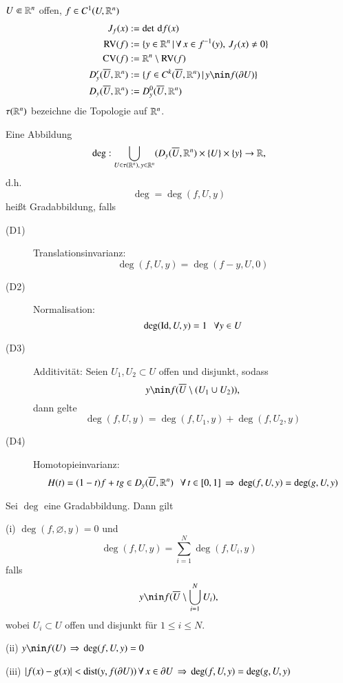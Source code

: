 $U\Subset \mathbb{R}^n$ offen, $f\in C^1(U,\mathbb{R}^n)$
\begin{align*}
    J_f(x)&:=\det \d f(x)\\
    \RV(f)&:=\{ y\in \R^n \,| \, \forall \, x\in f^{-1}(y), \, J_f(x)\neq 0 \}\\
    \CV(f)&:= \R^n \setminus \RV(f)\\
    D_y^r(\ol U, \R^n)&:=\{f\in C^k(\ol U, \R^n)\,|\,y\nin f(\partial U)\}\\
    D_y(\ol U, \R^n)&:=D_y^0(\ol U, \R^n)
\end{align*}
$\tau(\mathbb{R}^n)$ bezeichne die Topologie auf $\mathbb{R}^n$.
\begin{defi}
    Eine Abbildung
    \[
        \deg: \bigcup_{U\in \tau(\mathbb{R}^n),\, y\in \mathbb{R}^n} (D_y(\overline U, \mathbb{R}^n)\times \{U\}\times \{y\}\rightarrow \mathbb{R},
    \]
    d.h.
    \[
        \deg=\deg(f,U,y) 
    \]
    heißt Gradabbildung, falls
    \begin{description}
        \item[(D1)]
        Translationsinvarianz: 
        \[
            \deg(f,U,y)=\deg(f-y,U,0)
        \]
        \item[(D2)]
        Normalisation:
        \[
            \deg(\mathrm{Id},U,y)=1 \hspace{.25cm} \forall y\in U
        \]
        \item[(D3)]
        Additivität: Seien $U_1,U_2\subset U$ offen und disjunkt, sodass
        \[
            y\nin f(\ol U\setminus(U_1\cup U_2)),
        \]
        dann gelte
        \[
            \deg(f,U,y)=\deg(f,U_1,y)+\deg(f,U_2,y)
        \]
        \item[(D4)]
        Homotopieinvarianz: 
        \[
            H(t)=(1-t)f+tg \in D_y(\overline U,\mathbb{R}^n) \hspace{.25cm} \forall \, t\in [0,1]\, \Rightarrow \, \deg(f,U,y)=\deg(g,U,y)
        \]
\end{description}
\end{defi}

\begin{theorem}\label{2.1}
    Sei $\deg$ eine Gradabbildung. Dann gilt
    \begin{description}
        \item{(i)}
        $\deg(f,\varnothing,y)=0$ und
        \[
            \deg(f,U,y)=\sum_{i=1}^N \deg(f,U_i,y)
        \]
        falls 
        \[
            y\nin f(\ol U\setminus\bigcup_{i=1}^NU_i),
        \]
        wobei $U_i\subset U$ offen und disjunkt für $1\leq i \leq N$.
        \item{(ii)}
        $y\nin f(U) \, \Ra \, \deg(f,U,y)=0$
        \item{(iii)}
        $|f(x)-g(x)|<\mathrm{dist}(y,f(\partial U)) \, \forall \, x\in \partial U \, \Rightarrow \, \deg(f,U,y)
        =\deg(g,U,y)$
    \end{description}
\end{theorem}

